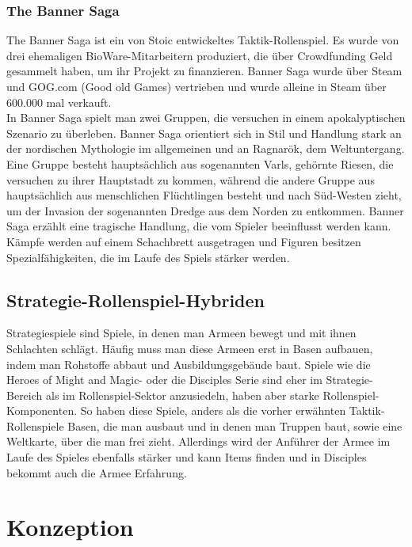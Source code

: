 \documentclass[extern,palatino]{cgBA}
\begin{document}
	\subsubsection{The Banner Saga}
	The Banner Saga ist ein von Stoic entwickeltes Taktik-Rollenspiel. Es wurde von drei ehemaligen BioWare-Mitarbeitern produziert, die über Crowdfunding Geld gesammelt haben, um ihr Projekt zu finanzieren. Banner Saga wurde über Steam und GOG.com (Good old Games) vertrieben und wurde alleine in Steam über 600.000 mal verkauft.
	\\In Banner Saga spielt man zwei Gruppen, die versuchen in einem apokalyptischen Szenario zu überleben. Banner Saga orientiert sich in Stil und Handlung stark an der nordischen Mythologie im allgemeinen und an Ragnarök, dem Weltuntergang. Eine Gruppe besteht hauptsächlich aus sogenannten Varls, gehörnte Riesen, die versuchen zu ihrer Hauptstadt zu kommen, während die andere Gruppe aus hauptsächlich aus menschlichen Flüchtlingen besteht und nach Süd-Westen zieht, um der Invasion der sogenannten Dredge aus dem Norden zu entkommen.
	Banner Saga erzählt eine tragische Handlung, die vom Spieler beeinflusst werden kann. Kämpfe werden auf einem Schachbrett ausgetragen und Figuren besitzen Spezialfähigkeiten, die im Laufe des Spiels stärker werden. 
	\subsection{Strategie-Rollenspiel-Hybriden} Strategiespiele sind Spiele, in denen man Armeen bewegt und mit ihnen Schlachten schlägt. Häufig muss man diese Armeen erst in Basen aufbauen, indem man Rohstoffe abbaut und Ausbildungsgebäude baut. Spiele wie die Heroes of Might and Magic- oder die Disciples Serie sind eher im Strategie-Bereich als im Rollenspiel-Sektor anzusiedeln, haben aber starke Rollenspiel-Komponenten. So haben diese Spiele, anders als die vorher erwähnten Taktik-Rollenspiele Basen, die man ausbaut und in denen man Truppen baut, sowie eine Weltkarte, über die man frei zieht. Allerdings wird der Anführer der Armee im Laufe des Spieles ebenfalls stärker und kann Items finden und in Disciples bekommt auch die Armee Erfahrung.
	
	
	\newpage
	\section {Konzeption}
\end{document}
